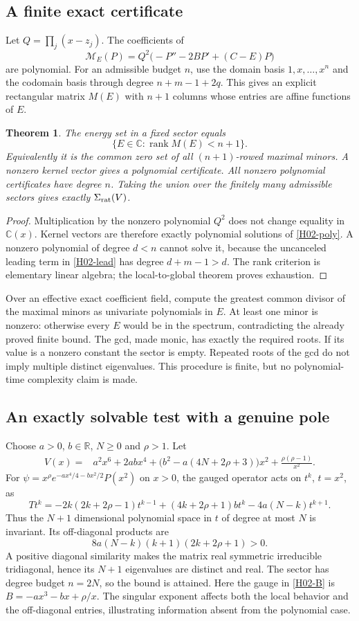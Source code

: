 \documentclass[11pt,a4paper]{article}
\newtheorem{theorem}{Theorem}[section]
\theoremstyle{definition}\newtheorem{definition}[theorem]{Definition}
\theoremstyle{remark}\newtheorem{remark}[theorem]{Remark}
\newcommand{\R}{\mathbb R}\newcommand{\C}{\mathbb C}\newcommand{\N}{\mathbb N}
\numberwithin{equation}{section}
\begin{document}
\subsection{A finite exact certificate}\label{H02-sec-4}
Let $Q=\prod_j(x-z_j)$. The coefficients of
\[\mathcal M_E(P)=Q^2\bigl(-P''-2BP'+(C-E)P\bigr)\]
are polynomial. For an admissible budget $n$, use the domain basis $1,x,\ldots,x^n$ and the codomain basis through degree $n+m-1+2q$. This gives an explicit rectangular matrix $M(E)$ with $n+1$ columns whose entries are affine functions of $E$.
\begin{theorem}\label{H02-algorithm}
The energy set in a fixed sector equals
\[\{E\in\C:\operatorname{rank}M(E)<n+1\}.\]
Equivalently it is the common zero set of all $(n+1)$-rowed maximal minors. A nonzero kernel vector gives a polynomial certificate. All nonzero polynomial certificates have degree $n$. Taking the union over the finitely many admissible sectors gives exactly $\Sigma_{\rm rat}(V)$.
\end{theorem}
\begin{proof}
Multiplication by the nonzero polynomial $Q^2$ does not change equality in $\C(x)$. Kernel vectors are therefore exactly polynomial solutions of \eqref{H02-poly}. A nonzero polynomial of degree $d<n$ cannot solve it, because the uncanceled leading term in \eqref{H02-lead} has degree $d+m-1>d$. The rank criterion is elementary linear algebra; the local-to-global theorem proves exhaustion.
\end{proof}
Over an effective exact coefficient field, compute the greatest common divisor of the maximal minors as univariate polynomials in $E$. At least one minor is nonzero: otherwise every $E$ would be in the spectrum, contradicting the already proved finite bound. The gcd, made monic, has exactly the required roots. If its value is a nonzero constant the sector is empty. Repeated roots of the gcd do not imply multiple distinct eigenvalues. This procedure is finite, but no polynomial-time complexity claim is made.
\subsection{An exactly solvable test with a genuine pole}\label{H02-sec-5}
Choose $a>0$, $b\in\R$, $N\ge0$ and $\rho>1$. Let
\begin{align*}
V(x)={}&a^2x^6+2abx^4+
\bigl(b^2-a(4N+2\rho+3)\bigr)x^2+\frac{\rho(\rho-1)}{x^2}.
\end{align*}
For $\psi=x^\rho e^{-ax^4/4-bx^2/2}P(x^2)$ on $x>0$, the gauged operator acts on $t^k$, $t=x^2$, as
\[Tt^k=-2k(2k+2\rho-1)t^{k-1}
 +(4k+2\rho+1)bt^k-4a(N-k)t^{k+1}.
\]
Thus the $N+1$ dimensional polynomial space in $t$ of degree at most $N$ is invariant. Its off-diagonal products are
\[8a(N-k)(k+1)(2k+2\rho+1)>0.\]
A positive diagonal similarity makes the matrix real symmetric irreducible tridiagonal, hence its $N+1$ eigenvalues are distinct and real. The sector has degree budget $n=2N$, so the bound is attained. Here the gauge in \eqref{H02-B} is $B=-ax^3-bx+\rho/x$. The singular exponent affects both the local behavior and the off-diagonal entries, illustrating information absent from the polynomial case.
\end{document}
